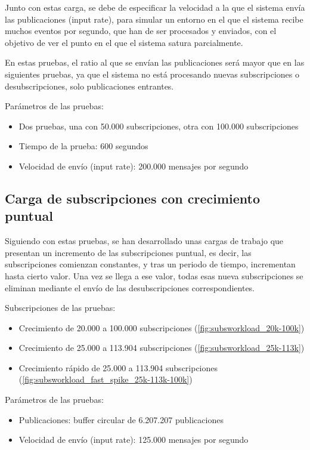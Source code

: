 Junto con estas carga, se debe de especificar la velocidad a la que el sistema 
envía las publicaciones (input rate), para simular un entorno en el que el 
sistema recibe muchos eventos por segundo, que han de ser procesados y enviados,
con el objetivo de ver el punto en el que el sistema satura parcialmente.

En estas pruebas, el ratio al que se envían las publicaciones será mayor que en 
las siguientes pruebas, ya que el sistema no está procesando nuevas subscripciones
o desubscripciones, solo publicaciones entrantes.

Parámetros de las pruebas:
\begin{itemize}
    \item Dos pruebas, una con 50.000 subscripciones, otra con 100.000 subscripciones
    \item Tiempo de la prueba: 600 segundos
    \item Velocidad de envío (input rate): 200.000 mensajes por segundo
\end{itemize}

\subsection{Carga de subscripciones con crecimiento puntual} \label{subsct:desarrollo_pruebas-esilbops_test-spike}

Siguiendo con estas pruebas, se han desarrollado unas cargas de trabajo que presentan
un incremento de las subscripciones puntual, es decir, las subscripciones comienzan
constantes, y tras un periodo de tiempo, incrementan hasta cierto valor. Una vez se
llega a ese valor, todas esas nueva subscripciones se eliminan mediante el envío de
las desubscripciones correspondientes.

Subscripciones de las pruebas:
\begin{itemize}
    \item Crecimiento de 20.000 a 100.000 subscripciones (\autoref{fig:subsworkload_20k-100k})
    \item Crecimiento de 25.000 a 113.904 subscripciones (\autoref{fig:subsworkload_25k-113k})
    \item Crecimiento rápido de 25.000 a 113.904 subscripciones (\autoref{fig:subsworkload_fast_spike_25k-113k-100k})
\end{itemize}

Parámetros de las pruebas:
\begin{itemize}
    \item Publicaciones: buffer circular de 6.207.207 publicaciones
    \item Velocidad de envío (input rate): 125.000 mensajes por segundo
\end{itemize}

